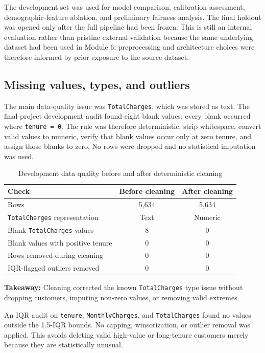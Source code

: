 \documentclass[11pt]{article}
\newcommand{\takeaway}[1]{\vspace{1pt}\noindent\textbf{Takeaway:} #1\vspace{3pt}}
\newcommand{\code}[1]{\texttt{#1}}
\begin{document}
The development set was used for model comparison, calibration assessment, demographic-feature ablation, and preliminary fairness analysis. The final holdout was opened only after the full pipeline had been frozen. This is still an internal evaluation rather than pristine external validation because the same underlying dataset had been used in Module 6; preprocessing and architecture choices were therefore informed by prior exposure to the source dataset.

\subsection{Missing values, types, and outliers}

The main data-quality issue was \code{TotalCharges}, which was stored as text. The final-project development audit found eight blank values; every blank occurred where \code{tenure = 0}. The rule was therefore deterministic: strip whitespace, convert valid values to numeric, verify that blank values occur only at zero tenure, and assign those blanks to zero. No rows were dropped and no statistical imputation was used.

\begin{table}[H]
\centering\small
\caption{Development data quality before and after deterministic cleaning}
\begin{tabular}{lcc}
\toprule
Check & Before cleaning & After cleaning \\
\midrule
Rows & 5,634 & 5,634 \\
\code{TotalCharges} representation & Text & Numeric \\
Blank \code{TotalCharges} values & 8 & 0 \\
Blank values with positive tenure & 0 & 0 \\
Rows removed during cleaning & 0 & 0 \\
IQR-flagged outliers removed & 0 & 0 \\
\bottomrule
\end{tabular}
\end{table}
\takeaway{Cleaning corrected the known \code{TotalCharges} type issue without dropping customers, imputing non-zero values, or removing valid extremes.}

An IQR audit on \code{tenure}, \code{MonthlyCharges}, and \code{TotalCharges} found no values outside the 1.5-IQR bounds. No capping, winsorization, or outlier removal was applied. This avoids deleting valid high-value or long-tenure customers merely because they are statistically unusual.
\end{document}
